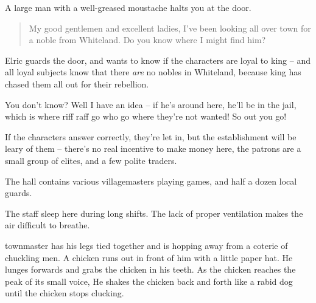 \begin{multicols}{2}


\begin{boxtext}

	A large man with a well-greased moustache halts you at the door.

	\begin{quotation}

		My good gentlemen and excellent ladies, I've been looking all over town for a noble from Whiteland.  Do you know where I might find him?

	\end{quotation}

\end{boxtext}

Elric guards the door, and wants to know if the characters are loyal to \gls{king} -- and all loyal subjects know that there \emph{are} no nobles in Whiteland, because \gls{king} has chased them all out for their rebellion.

\begin{speechtext}

	You don't know?  Well I have an idea -- if he's around here, he'll be in the jail, which is where riff raff go who go where they're not wanted!
	So out you go!

\end{speechtext}

If the characters answer correctly, they're let in, but the establishment will be leary of them -- there's no real incentive to make money here, the patrons are a small group of elites, and a few polite traders.

The hall contains various villagemasters playing games, and half a dozen local guards.


The staff sleep here during long shifts.  The lack of proper ventilation makes the air difficult to breathe.


\begin{boxtext}

	\Gls{townmaster} has his legs tied together and is hopping away from a coterie of chuckling men.  A chicken runs out in front of him with a little paper hat.  He lunges forwards and grabs the chicken in his teeth.  As the chicken reaches the peak of its small voice, He shakes the chicken back and forth like a rabid dog until the chicken stops clucking.


\end{boxtext}
\end{multicols}

